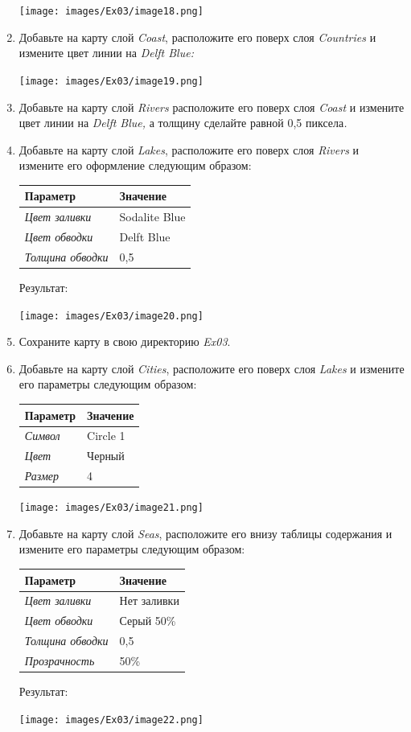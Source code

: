 \documentclass[12pt,]{book}
\begin{document}
\begin{enumerate}
  \texttt{[image: images/Ex03/image18.png]}
\item
  Добавьте на карту слой \emph{Coast}, расположите его поверх слоя \emph{Countries} и измените цвет линии на \emph{Delft Blue:}

  \texttt{[image: images/Ex03/image19.png]}
\item
  Добавьте на карту слой \emph{Rivers} расположите его поверх слоя \emph{Coast} и измените цвет линии на \emph{Delft Blue,} а толщину сделайте равной 0,5 пиксела\emph{.}
\item
  Добавьте на карту слой \emph{Lakes}, расположите его поверх слоя \emph{Rivers} и измените его оформление следующим образом:

  \begin{longtable}[]{@{}ll@{}}
  \toprule
  \textbf{Параметр} & \textbf{Значение}\tabularnewline
  \midrule
  \endhead
  \emph{Цвет заливки} & Sodalite Blue\tabularnewline
  \emph{Цвет обводки} & Delft Blue\tabularnewline
  \emph{Толщина обводки} & 0,5\tabularnewline
  \bottomrule
  \end{longtable}

  Результат:

  \texttt{[image: images/Ex03/image20.png]}
\item
  Сохраните карту в свою директорию \emph{Ex03}.
\item
  Добавьте на карту слой \emph{Cities}, расположите его поверх слоя \emph{Lakes} и измените его параметры следующим образом:

  \begin{longtable}[]{@{}ll@{}}
  \toprule
  \textbf{Параметр} & \textbf{Значение}\tabularnewline
  \midrule
  \endhead
  \emph{Символ} & Circle 1\tabularnewline
  \emph{Цвет} & Черный\tabularnewline
  \emph{Размер} & 4\tabularnewline
  \bottomrule
  \end{longtable}

  \texttt{[image: images/Ex03/image21.png]}
\item
  Добавьте на карту слой \emph{Seas}, расположите его внизу таблицы содержания и измените его параметры следующим образом:

  \begin{longtable}[]{@{}ll@{}}
  \toprule
  \textbf{Параметр} & \textbf{Значение}\tabularnewline
  \midrule
  \endhead
  \emph{Цвет заливки} & Нет заливки\tabularnewline
  \emph{Цвет обводки} & Серый 50\%\tabularnewline
  \emph{Толщина обводки} & 0,5\tabularnewline
  \emph{Прозрачность} & 50\%\tabularnewline
  \bottomrule
  \end{longtable}

  Результат:

  \texttt{[image: images/Ex03/image22.png]}
\end{enumerate}
\end{document}

